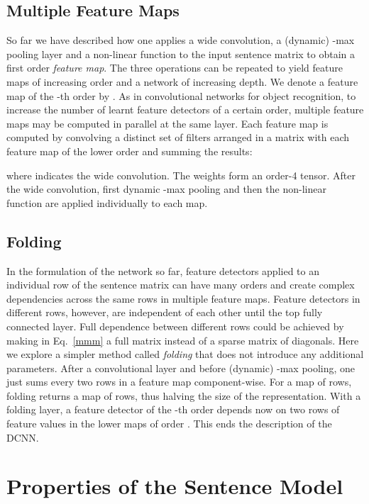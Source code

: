 \documentclass[11pt]{article}
\begin{document}
\subsection{Multiple Feature Maps}

So far we have described  how one applies a wide convolution, a (dynamic) -max pooling layer and a non-linear function to the input sentence matrix to obtain a first order \emph{feature map}. The three operations can be repeated to yield feature maps of increasing order and a network of increasing depth. We denote a feature map of the -th order by . As in convolutional networks for object recognition, to increase the number of learnt feature detectors of a certain order, multiple feature maps  may be computed in parallel at the same layer. Each feature map  is computed by convolving a distinct set of filters arranged in a matrix  with each feature map  of the lower order  and summing the results:
\vspace{-8pt}

\vspace{-12pt}

\noindent where  indicates the wide convolution. The weights  form an order-4 tensor. After the wide convolution, first dynamic -max pooling and then the non-linear function are applied individually to each map.

\subsection{Folding}
In the formulation of the network so far, feature detectors applied to an individual row of the sentence matrix  can have many orders and create complex dependencies across the same rows in multiple feature maps. Feature detectors in different rows, however, are independent of each other until the top  fully connected layer. Full dependence between different rows could be achieved by making  in Eq.~\ref{mmm} a full matrix instead of a sparse matrix of diagonals. Here we explore a simpler method called \emph{folding} that does not introduce any additional parameters. After a convolutional layer and before (dynamic) -max pooling, one just sums every two rows in a feature map component-wise. For a map of  rows, folding returns a map of  rows, thus halving the size of the representation. With a folding layer, a feature detector of the -th order depends now on two rows of feature values in the lower maps of order . This ends the description of the DCNN.

\section{Properties of the Sentence Model}
\label{prop}
\end{document}
